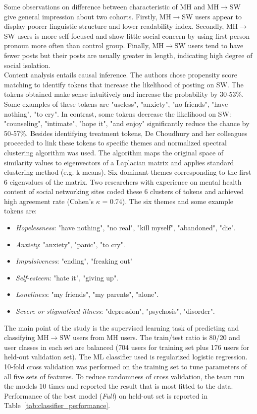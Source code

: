 Some observations on difference between characteristic of MH and  MH$\rightarrow$SW give general impression about two cohorts. Firstly, MH$\rightarrow$SW users appear to display poorer linguistic structure and lower readability index. Secondly,  MH$\rightarrow$SW users is more self-focused and show little social concern by using first person pronoun more often than control group. Finally, MH$\rightarrow$SW users tend to have fewer posts but their posts are usually greater in length, indicating high degree of social isolation.\\
Content analysis entails causal inference. The authors chose propensity score matching \cite{Rosenbaum1983} to identify tokens that increase the likelihood of posting on SW. The tokens obtained make sense intuitively and increase the probability by 30-53\%. Some examples of these tokens are "useless", "anxiety", "no friends", "have nothing", "to cry". In contrast, some tokens decrease the likelihood on SW: "counseling", "intimate", "hope it", "and enjoy" significantly reduce the chance by 50-57\%. Besides identifying treatment tokens,  De Choudhury and her colleagues proceeded to link these tokens to specific themes and normalized spectral clustering algorithm was used. The algorithm maps the original space of similarity values to eigenvectors of a Laplacian matrix and applies standard clustering method (e.g. k-means). Six dominant themes corresponding to the first 6 eigenvalues of the matrix. Two researchers with experience on mental health content of social networking sites coded these 6 clusters of tokens and achieved high agreement rate (Cohen's $\kappa$ = 0.74). The six themes and some example tokens are:
\begin{itemize}
\item \textit{Hopelessness}: "have nothing", "no real", "kill myself", "abandoned", "die".
\item \textit{Anxiety}: "anxiety", "panic", "to cry".
\item \textit{Impulsiveness}: "ending", "freaking out"
\item \textit{Self-esteem}: "hate it", "giving up".
\item \textit{Loneliness}: "my friends", "my parents", "alone".
\item \textit{Severe or stigmatized illness}: "depression", "psychosis", "disorder".
\end{itemize}
The main point of the study is the supervised learning task of predicting and classifying MH$\rightarrow$SW users from MH users. The train/test ratio is 80/20 and user classes in each set are balanced (704 users for training set plus 176 users for held-out validation set). The ML classifier used is regularized logistic regression. 10-fold cross validation was performed on the training set to tune parameters of all five sets of features. To reduce randomness of cross validation, the team run the models 10 times and reported the result that is most fitted to the data. Performance of the best model (\textit{Full}) on held-out set is reported in Table~\ref{tab:classifier_performance}.\\
